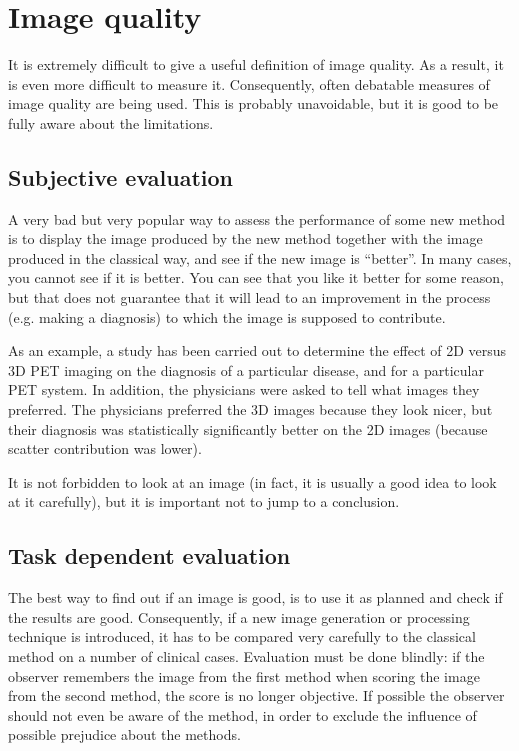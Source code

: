 \documentclass[11pt,oneside]{book}
\begin{document}
\section{Image quality}
It is extremely difficult to give a useful definition of image quality. As a
result, it is even more difficult to measure it. Consequently, often debatable
measures of image quality are being used. This is probably unavoidable, but it
is good to be fully aware about the limitations.

\subsection{Subjective evaluation}
A very bad but very popular way to assess the performance of some new method
is to display the image produced by the new method together with the image
produced in the classical way, and see if the new image is ``better''. In many
cases, you cannot see if it is better. You can see that you like it better for
some reason, but that does not guarantee that it will lead to an improvement
in the process (e.g. making a diagnosis) to which the image is supposed to
contribute.

As an example, a study has been carried out to determine the effect of
2D versus 3D PET imaging on the diagnosis of a particular disease, and
for a particular PET system. In addition, the physicians were asked to
tell what images they preferred. The physicians preferred the 3D
images because they look nicer, but their diagnosis was statistically
significantly better on the 2D images (because scatter contribution
was lower).

It is not forbidden to look at an image (in fact, it is usually a good
idea to look at it carefully), but it is important not to jump to a
conclusion.

\subsection{Task dependent evaluation}
The best way to find out if an image is good, is to use it as planned and
check if the results are good. Consequently, if a new image generation or
processing technique is introduced, it has to be compared very carefully to
the classical method on a number of clinical cases. Evaluation must be done
blindly: if the observer remembers the image from the first method when
scoring the image from the second method, the score is no longer objective. If
possible the observer should not even be aware of the method, in order to
exclude the influence of possible prejudice about the methods.
\end{document}
